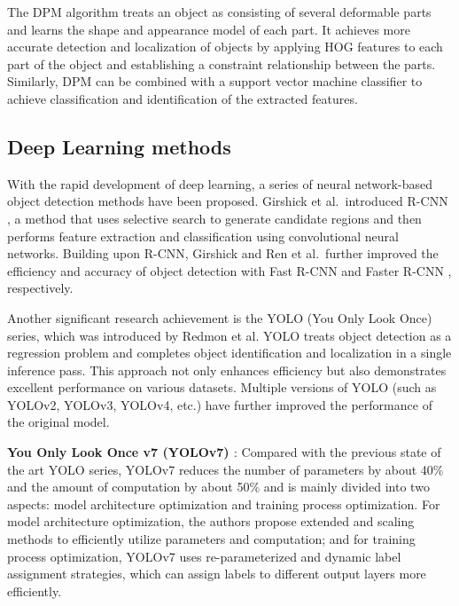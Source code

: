 \documentclass[PhD]{PHlab-thesis}
\begin{document}
The DPM algorithm treats an object as consisting of several deformable parts and learns the shape and appearance model of each part. It achieves more accurate detection and localization of objects by applying HOG features to each part of the object and establishing a constraint relationship between the parts. Similarly, DPM can be combined with a support vector machine classifier to achieve classification and identification of the extracted features.


\subsection{Deep Learning methods}
With the rapid development of deep learning, a series of neural network-based object detection methods have been proposed. Girshick et al.~introduced R-CNN \cite{girshick2014rich}, a method that uses selective search to generate candidate regions and then performs feature extraction and classification using convolutional neural networks. Building upon R-CNN, Girshick and Ren et al.~further improved the efficiency and accuracy of object detection with Fast R-CNN \cite{girshick2015fast} and Faster R-CNN \cite{ren2015faster}, respectively.

Another significant research achievement is the YOLO \cite{redmon2016you} (You Only Look Once) series, which was introduced by Redmon et al. YOLO treats object detection as a regression problem and completes object identification and localization in a single inference pass. This approach not only enhances efficiency but also demonstrates excellent performance on various datasets. Multiple versions of YOLO (such as YOLOv2, YOLOv3, YOLOv4, etc.) have further improved the performance of the original model.

\textbf{You Only Look Once v7 (YOLOv7) \cite{wang2023yolov7}}: Compared with the previous state of the art YOLO series, YOLOv7 reduces the number of parameters by about 40\% and the amount of computation by about 50\% and is mainly divided into two aspects: model architecture optimization and training process optimization. For model architecture optimization, the authors propose extended and scaling methods to efficiently utilize parameters and computation; and for training process optimization, YOLOv7 uses re-parameterized and dynamic label assignment strategies, which can assign labels to different output layers more efficiently.
\end{document}
